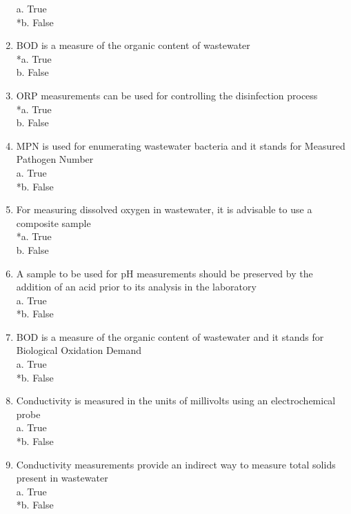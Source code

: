 \begin{enumerate}
a. True \\
*b. False 

\item  BOD is a measure of the organic content of wastewater \\

*a. True \\
b. False 

\item  ORP measurements can be used for controlling the disinfection process \\

*a. True \\
b. False 

\item  MPN is used for enumerating wastewater bacteria and it stands for Measured Pathogen Number \\

a. True \\
*b. False 

\item  For measuring dissolved oxygen in wastewater, it is advisable to use a composite sample \\

*a. True \\
b. False 

\item  A sample to be used for pH measurements should be preserved by the addition of an acid prior to its analysis in the laboratory \\

a. True \\
*b. False 

\item  BOD is a measure of the organic content of wastewater and it stands for Biological Oxidation Demand \\

a. True \\
*b. False 

\item  Conductivity is measured in the units of millivolts using an electrochemical probe \\

a. True \\
*b. False 

\item  Conductivity measurements provide an indirect way to measure total solids present in wastewater \\

a. True \\
*b. False 


\end{enumerate}
